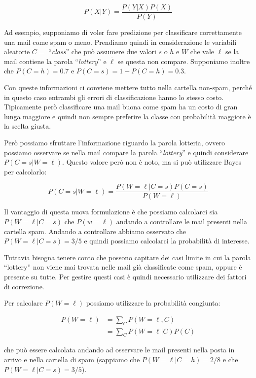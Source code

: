 $$
P(X|Y) = \frac{P(Y|X)P(X)}{P(Y)}
$$

\noindent Ad esempio, supponiamo di voler fare predizione per classificare correttamente una mail come spam o meno. Prendiamo quindi in considerazione le variabili aleatorie $C = $ ``\textit{class}'' che può assumere due valori $s$ o $h$ e $W$ che vale $\ell$ se la mail contiene la parola ``\textit{lottery}'' e $\overline{\ell}$ se questa non compare.
Supponiamo inoltre che $P(C = h) = 0.7$ e $P(C = s) = 1 - P(C = h) = 0.3$. 

Con queste informazioni ci conviene mettere tutto nella cartella non-spam, perché in questo caso entrambi gli errori di classificazione hanno lo stesso costo. Tipicamente però classificare una mail buona come spam ha un costo di gran lunga maggiore e quindi non sempre preferire la classe con probabilità maggiore è la scelta giusta.

Però possiamo sfruttare l'informazione riguardo la parola lotteria, ovvero possiamo osservare se nella mail compare la parola ``\textit{lottery}'' e quindi considerare $P(C = s | W = \ell)$. Questo valore però non è noto, ma si può utilizzare Bayes per calcolarlo:

$$
P(C = s | W = \ell) = \frac{P(W = \ell | C = s)P(C=s)}{P(W = \ell)}
$$

\noindent Il vantaggio di questa nuova formulazione è che possiamo calcolarci sia $P(W = \ell | C = s)$ che $P(w = \ell)$ andando a controllare le mail presenti nella cartella spam.
Andando a controllare abbiamo osservato che $P(W = \ell | C = s) = 3/5$ e quindi possiamo calcolarci la probabilità di interesse.

Tuttavia bisogna tenere conto che possono capitare dei casi limite in cui la parola ``lottery'' non viene mai trovata nelle mail già classificate come spam, oppure è presente su tutte. Per gestire questi casi è quindi necessario utilizzare dei fattori di correzione.

Per calcolare $P(W = \ell)$ possiamo utilizzare la probabilità congiunta:

\begin{align*}
	P(W = \ell)&= \sum\limits_{C} P(W = \ell, C) \\
			&= \sum\limits_{C} P(W = \ell | C)P(C)
\end{align*}

\noindent che può essere calcolata andando ad osservare le mail presenti nella posta in arrivo e nella cartella di spam (sappiamo che $P(W = \ell | C = h) = 2/8$ e che $P(W = \ell | C = s) = 3/5$).

